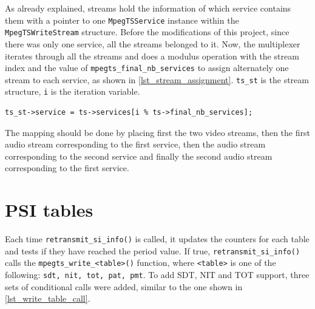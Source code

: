 \documentclass[
	12pt,				%
	openright,			%
	twoside,			%
	a4paper,			%
	brazil,
	french,				%
	english
	]{abntex2}
\begin{document}
As already explained, streams hold the information of which service contains them with a pointer to one \texttt{MpegTSService} instance within the \texttt{MpegTSWriteStream} structure. Before the modifications of this project, since there was only one service, all the streams belonged to it. Now, the multiplexer iterates through all the streams and does a modulus operation with the stream index and the value of \texttt{mpegts\hspace{0.1mm}\_\hspace{0.1mm}final\hspace{0.1mm}\_\hspace{0.1mm}nb\hspace{0.1mm}\_\hspace{0.1mm}services} to assign alternately one stream to each service, as shown in \autoref{lst_stream_assignment}. \texttt{ts\hspace{0.1mm}\_\hspace{0.1mm}st} is the stream structure, \texttt{i} is the iteration variable.

\begin{lstlisting}[caption={Assigning streams to services.}, label={lst_stream_assignment}]
ts_st->service = ts->services[i % ts->final_nb_services];
\end{lstlisting}

The mapping should be done by placing first the two video streams, then the first audio stream corresponding to the first service, then the audio stream corresponding to the second service and finally the second audio stream corresponding to the first service.

\section{PSI tables}

Each time \texttt{retransmit\hspace{0.1mm}\_\hspace{0.1mm}si\hspace{0.1mm}\_\hspace{0.1mm}info()} is called, it updates the counters for each table and tests if they have reached the period value. If true, \texttt{retransmit\hspace{0.1mm}\_\hspace{0.1mm}si\hspace{0.1mm}\_\hspace{0.1mm}info()} calls the \texttt{mpegts\hspace{0.1mm}\_\hspace{0.1mm}write\hspace{0.1mm}\_\hspace{0.1mm}<table>()} function, where \texttt{<table>} is one of the following: \texttt{sdt, nit, tot, pat, pmt}. To add SDT, NIT and TOT support, three sets of conditional calls were added, similar to the one shown in \autoref{lst_write_table_call}.
\end{document}
